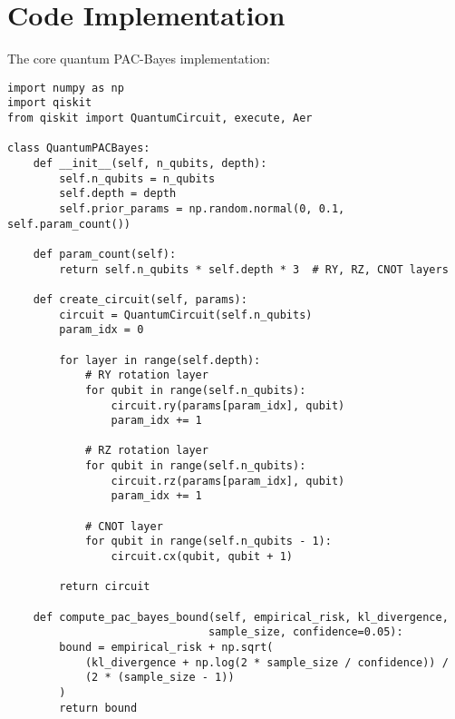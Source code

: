 \documentclass{article}
\begin{document}
\section{Code Implementation}

The core quantum PAC-Bayes implementation:

\begin{lstlisting}[style=py]
import numpy as np
import qiskit
from qiskit import QuantumCircuit, execute, Aer

class QuantumPACBayes:
    def __init__(self, n_qubits, depth):
        self.n_qubits = n_qubits
        self.depth = depth
        self.prior_params = np.random.normal(0, 0.1, self.param_count())
        
    def param_count(self):
        return self.n_qubits * self.depth * 3  # RY, RZ, CNOT layers
        
    def create_circuit(self, params):
        circuit = QuantumCircuit(self.n_qubits)
        param_idx = 0
        
        for layer in range(self.depth):
            # RY rotation layer
            for qubit in range(self.n_qubits):
                circuit.ry(params[param_idx], qubit)
                param_idx += 1
                
            # RZ rotation layer  
            for qubit in range(self.n_qubits):
                circuit.rz(params[param_idx], qubit)
                param_idx += 1
                
            # CNOT layer
            for qubit in range(self.n_qubits - 1):
                circuit.cx(qubit, qubit + 1)
                
        return circuit
        
    def compute_pac_bayes_bound(self, empirical_risk, kl_divergence, 
                               sample_size, confidence=0.05):
        bound = empirical_risk + np.sqrt(
            (kl_divergence + np.log(2 * sample_size / confidence)) / 
            (2 * (sample_size - 1))
        )
        return bound
\end{lstlisting}
\end{document}
